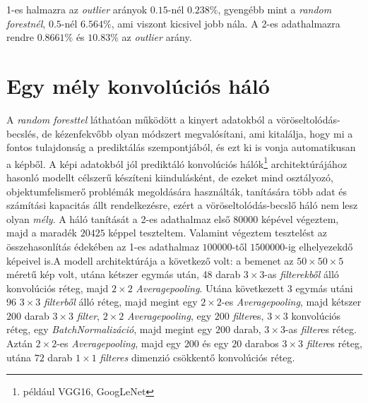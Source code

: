\documentclass[12pt,letterpaper,oneside,openright]{book}
\begin{document}
1-es halmazra az \textit{outlier} arányok $0.15$-nél $0.238\%$, gyengébb mint a \textit{random forestnél}, $0.5$-nél $6.564\%$, ami viszont kicsivel jobb nála. A 2-es adathalmazra rendre $0.8661\%$ és $10.83\%$ az \textit{outlier} arány.
 
 \section{Egy mély konvolúciós háló}
 A \textit{random foresttel} láthatóan működött a kinyert adatokból a vöröseltolódás-becslés, de kézenfekvőbb olyan módszert megvalósítani, ami kitalálja, hogy mi a fontos tulajdonság a prediktálás szempontjából, és ezt ki is vonja automatikusan a képből.  
 \newline\indent
 A képi adatokból jól prediktáló konvolúciós hálók\footnote{például VGG16, GoogLeNet} architektúrájához hasonló modellt célszerű készíteni kiindulásként, de ezeket mind osztályozó, objektumfelismerő problémák megoldására használták, tanítására több adat és számítási kapacitás állt rendelkezésre, ezért a vöröseltolódás-becslő háló nem lesz olyan \textit{mély}. A háló tanítását a 2-es adathalmaz első $\num{80000}$ képével végeztem, majd a maradék $\num{20425}$ képpel teszteltem. Valamint végeztem tesztelést az összehasonlítás édekében az 1-es adathalmaz $\num{100000}$-től $1500000$-ig elhelyezekdő képeivel is.\newline\indent A modell architektúrája a következő volt: a bemenet az $50\times50\times5$ méretű kép volt, utána kétszer egymás után, 48 darab $3\times 3$-as \textit{filterekből} álló konvolúciós réteg, majd $2\times 2$ \textit{Averagepooling}. Utána következett 3 egymás utáni $96$ $3\times3$ \textit{filterből} álló réteg, majd megint egy $2\times2$-es \textit{Averagepooling}, majd kétszer $200$ darab $3\times3$ \textit{filter}, $2\times 2$ \textit{Averagepooling}, egy $200$ \textit{filter}es, $3\times 3$ konvolúciós réteg, egy \textit{BatchNormalizáció}, majd megint egy $200$ darab, $3\times 3$-as \textit{filter}es réteg. Aztán $2\times 2$-es \textit{Averagepooling}, majd egy $200$ és egy $20$ darabos $3\times 3$ \textit{filter}es réteg, utána $72$ darab $1\times 1$ \textit{filteres} dimenzió csökkentő konvolúciós réteg.
\end{document}
